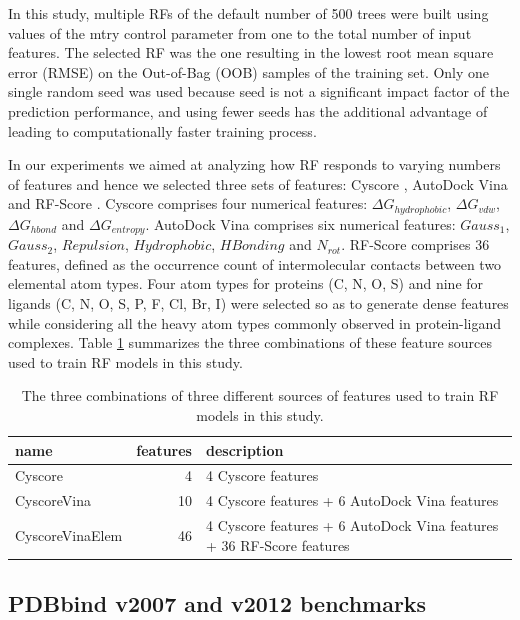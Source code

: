 \documentclass[journal=jacsat,manuscript=article]{achemso}
\begin{document}
In this study, multiple RFs of the default number of 500 trees were built using values of the mtry control parameter from one to the total number of input features. The selected RF was the one resulting in the lowest root mean square error (RMSE) on the Out-of-Bag (OOB) samples of the training set. Only one single random seed was used because seed is not a significant impact factor of the prediction performance, and using fewer seeds has the additional advantage of leading to computationally faster training process.

In our experiments we aimed at analyzing how RF responds to varying numbers of features and hence we selected three sets of features: Cyscore \cite{1372}, AutoDock Vina \cite{595} and RF-Score \cite{564}. Cyscore comprises four numerical features: $\Delta G_{hydrophobic}$, $\Delta G_{vdw}$, $\Delta G_{hbond}$ and $\Delta G_{entropy}$. AutoDock Vina comprises six numerical features: $Gauss_1$, $Gauss_2$, $Repulsion$, $Hydrophobic$, $HBonding$ and $N_{rot}$. RF-Score comprises 36 features, defined as the occurrence count of intermolecular contacts between two elemental atom types. Four atom types for proteins (C, N, O, S) and nine for ligands (C, N, O, S, P, F, Cl, Br, I) were selected so as to generate dense features while considering all the heavy atom types commonly observed in protein-ligand complexes. Table \ref{tbl:features} summarizes the three combinations of these feature sources used to train RF models in this study.

\begin{table}[h]
\caption{The three combinations of three different sources of features used to train RF models in this study.}
\label{tbl:features}
\begin{tabular}{lrl}
\hline
name & features & description\\
\hline
Cyscore         &  4 & 4 Cyscore features\\
CyscoreVina     & 10 & 4 Cyscore features + 6 AutoDock Vina features\\
CyscoreVinaElem & 46 & 4 Cyscore features + 6 AutoDock Vina features + 36 RF-Score features\\
\hline
\end{tabular}
\end{table}

\subsection{PDBbind v2007 and v2012 benchmarks}
\end{document}
